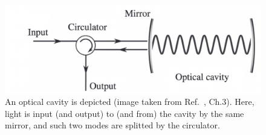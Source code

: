 \begin{figure}[t]
    \centering
    \includegraphics[width=1.\textwidth]{Figures/CMON/INTRO/cavitiy_jacobs.png}
    \caption{An optical cavity is depicted (image taken from Ref.~\cite{jacobs_2014}, Ch.3). Here, light is input (and output) to (and from) the cavity by the same mirror, and such two modes are splitted by the circulator.}
    \label{fig:cavityCMON}
\end{figure}

